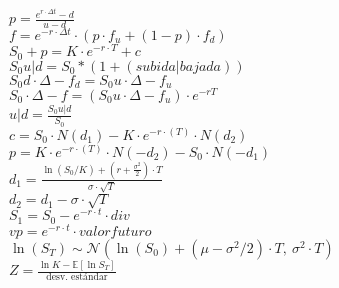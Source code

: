 \documentclass[12pt]{article}
\begin{document}
\newcommand{\arbol}{$p = \frac{e^{r\cdot \Delta t}-d}{u-d}$}
\newcommand{\neutral}{$f = e^{-r \cdot \Delta t}\cdot (p \cdot f_u+(1-p) \cdot f_d)$}
\newcommand{\putcall}{$S_0+p = K \cdot e^{-r \cdot T}+c$}
\newcommand{\ceroud}{$S_0u|d=S_0*(1+(subida|bajada)) $}
\newcommand{\neutrali}{$S_0d\cdot \Delta-f_d=S_0u\cdot \Delta-f_u$}
\newcommand{\portafolio}{$S_0\cdot \Delta-f=(S_0u\cdot \Delta-f_u) \cdot e^{-rT}$}
\newcommand{\calcud}{$u|d=\frac{S_0u|d}{S_0}$}
\newcommand{\callbsm}{$c =  S_0 \cdot N(d_1)- K \cdot e^{-r \cdot (T)} \cdot N(d_2) $}
\newcommand{\putbsm}{$p = K \cdot e^{-r \cdot (T)} \cdot N(-d_2) - S_0 \cdot N(-d_1)$}
\newcommand{\Duno }{$  d_1 = \frac{\ln(S_0 / K) + \left( r + \frac{\sigma^2}{2} \right) \cdot T}{\sigma \cdot \sqrt{T}}$}
\newcommand{\Ddos}{$d_2 = d_1 - \sigma \cdot \sqrt{T}$}
\newcommand{\dividendo}{$S_1 = S_0 - e^{-r \cdot t} \cdot div $}
\newcommand{\vp}{$vp =e^{-r \cdot t} \cdot valor futuro $}
\newcommand{\browniano}{$\ln (S_T) \sim \mathcal{N}\left(\ln (S_0) + (\mu - \sigma^2/2)\cdot T,\ \sigma^2 \cdot T\right)$ }
\newcommand{\standarizar}{$Z = \frac{\ln K - \mathbb{E}[\ln S_T]}{\text{desv.\ estándar}}$}
\arbol\\ \vspace{2em}
\neutral\\ \vspace{2em}
\putcall\\ \vspace{2em}
\ceroud\\ \vspace{2em}
\neutrali\\ \vspace{2em}
\portafolio\\ \vspace{2em}
\calcud\\ \vspace{2em}
\callbsm\\ \vspace{2em}
\putbsm\\ \vspace{2em}
\Duno\\ \vspace{2em}
\Ddos\\ \vspace{2em}
\dividendo\\ \vspace{2em}
\vp\\ \vspace{2em}
\browniano\\ \vspace{2em}
\standarizar\\ \vspace{2em}
\end{document}
